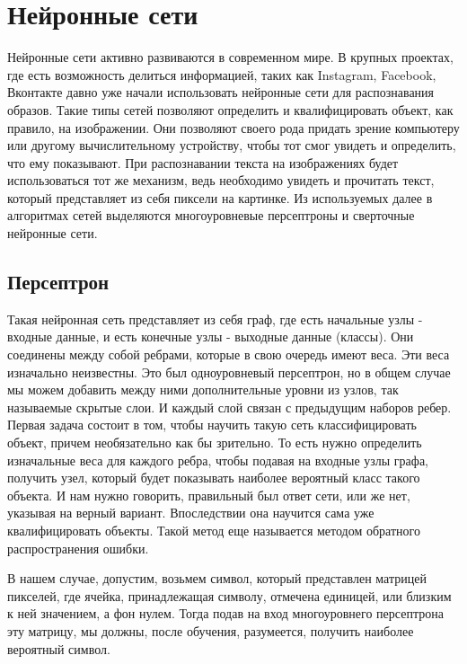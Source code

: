 \chapter{Нейронные сети} \label{ch4}


Нейронные сети активно развиваются в современном мире. В крупных проектах, где есть возможность делиться информацией, таких как Instagram, Facebook, Вконтакте давно уже начали использовать нейронные сети для распознавания образов. Такие типы сетей позволяют определить и квалифицировать объект, как правило, на изображении. Они позволяют своего рода придать зрение компьютеру или другому вычислительному устройству, чтобы тот смог увидеть и определить, что ему показывают. При распознавании текста на изображениях будет использоваться тот же механизм, ведь необходимо увидеть и прочитать текст, который представляет из себя пиксели на картинке. Из используемых далее в алгоритмах сетей выделяются многоуровневые персептроны и сверточные нейронные сети. \cite{neiron1}
	
\section{Персептрон} \label{ch4:sec1}
Такая нейронная сеть представляет из себя граф, где есть начальные узлы - входные данные, и есть конечные узлы - выходные данные (классы). Они соединены между собой ребрами, которые в свою очередь имеют веса. Эти веса изначально неизвестны. Это был одноуровневый персептрон, но в общем случае мы можем добавить между ними дополнительные уровни из узлов, так называемые скрытые слои. И каждый слой связан с предыдущим наборов ребер. Первая задача состоит в том, чтобы научить такую сеть классифицировать объект, причем необязательно как бы зрительно. То есть нужно определить изначальные веса для каждого ребра, чтобы подавая на входные узлы графа, получить узел, который будет показывать наиболее вероятный класс такого объекта. И нам нужно говорить, правильный был ответ сети, или же нет, указывая на верный вариант. Впоследствии она научится сама уже квалифицировать объекты. Такой метод еще называется методом обратного распространения ошибки.

В нашем случае, допустим, возьмем символ, который представлен матрицей пикселей, где ячейка, принадлежащая символу, отмечена единицей, или близким к ней значением, а фон нулем. Тогда подав на вход многоуровнего персептрона эту матрицу, мы должны, после обучения, разумеется, получить наиболее вероятный символ.  \cite{cit1}


